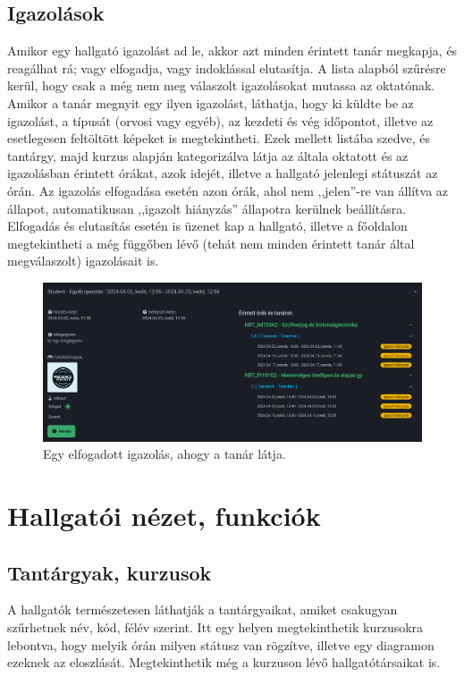 \documentclass[
]{thesis-ekf}
\theoremstyle{definition}
\theoremstyle{remark}
\begin{document}
\subsection{Igazolások}

Amikor egy hallgató igazolást ad le, akkor azt minden érintett tanár megkapja, és reagálhat rá; vagy elfogadja, vagy indoklással elutasítja. A lista alapból szűrésre kerül, hogy csak a még nem meg válaszolt igazolásokat mutassa az oktatónak. Amikor a tanár megnyit egy ilyen igazolást, láthatja, hogy ki küldte be az igazolást, a típusát (orvosi vagy egyéb), az kezdeti és vég időpontot, illetve az esetlegesen feltöltött képeket is megtekintheti. Ezek mellett listába szedve, és tantárgy, majd kurzus alapján kategorizálva látja az általa oktatott és az igazolásban érintett órákat, azok idejét, illetve a hallgató jelenlegi státuszát az órán. Az igazolás elfogadása esetén azon órák, ahol nem ,,jelen''-re van állítva az állapot, automatikusan ,,igazolt hiányzás'' állapotra kerülnek beállításra. Elfogadás és elutasítás esetén is üzenet kap a hallgató, illetve a főoldalon megtekintheti a még függőben lévő (tehát nem minden érintett tanár által megválaszolt) igazolásait is.

\begin{figure}[ht!]
	\centering
	\includegraphics[width=15cm]{../pictures/screenshots/just_teacher.png}
	\caption{Egy elfogadott igazolás, ahogy a tanár látja.}
	\label{justTeacher}
\end{figure}

\section{Hallgatói nézet, funkciók}

\subsection{Tantárgyak, kurzusok}

A hallgatók természetesen láthatják a tantárgyaikat, amiket csakugyan szűrhetnek név, kód, félév szerint. Itt egy helyen megtekinthetik kurzusokra lebontva, hogy melyik órán milyen státusz van rögzítve, illetve egy diagramon ezeknek az eloszlását. Megtekinthetik még a kurzuson lévő hallgatótársaikat is.
\end{document}
